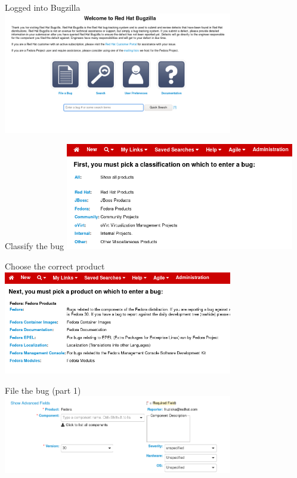 \documentclass[12pt]{beamer}
\begin{document}
\begin{frame}{Logged into Bugzilla}
\includegraphics[width=10cm]{images/bz_logged.png}
\end{frame}

\begin{frame}{Classify the bug}
\includegraphics[width=10cm]{images/bz_classification.png}
\end{frame}

\begin{frame}{Choose the correct product}
\includegraphics[width=10cm]{images/bz_product.png}
\end{frame}

\begin{frame}{File the bug (part 1)}
\includegraphics[width=10cm]{images/bz_header.png}
\end{frame}
\end{document}
